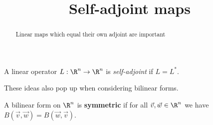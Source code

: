 \documentclass{ximera}
\title{Self-adjoint maps}
\begin{document}
\begin{abstract}
  Linear maps which equal their own adjoint are important
\end{abstract}\maketitle

\begin{definition}
  A linear operator $L:\R^n \to \R^n$ is \textit{self-adjoint} if $L = L^*$.
\end{definition}

These ideas also pop up when considering bilinear forms.
\begin{definition}
  A bilinear form on $\R^n$ is \textbf{symmetric} if for all $\vec{v},\vec{w} \in \R^n$ we have $B(\vec{v},\vec{w}) = B(\vec{w},\vec{v})$.
\end{definition}
\end{document}

